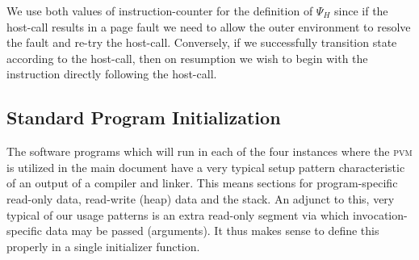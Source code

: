 We use both values of instruction-counter for the definition of $\Psi_H$ since if the host-call results in a page fault we need to allow the outer environment to resolve the fault and re-try the host-call. Conversely, if we successfully transition state according to the host-call, then on resumption we wish to begin with the instruction directly following the host-call.

\subsection{Standard Program Initialization}\label{sec:standardprograminit}
The software programs which will run in each of the four instances where the \textsc{pvm} is utilized in the main document have a very typical setup pattern characteristic of an output of a compiler and linker. This means sections for program-specific read-only data, read-write (heap) data and the stack. An adjunct to this, very typical of our usage patterns is an extra read-only segment via which invocation-specific data may be passed (\ie arguments). It thus makes sense to define this properly in a single initializer function.


